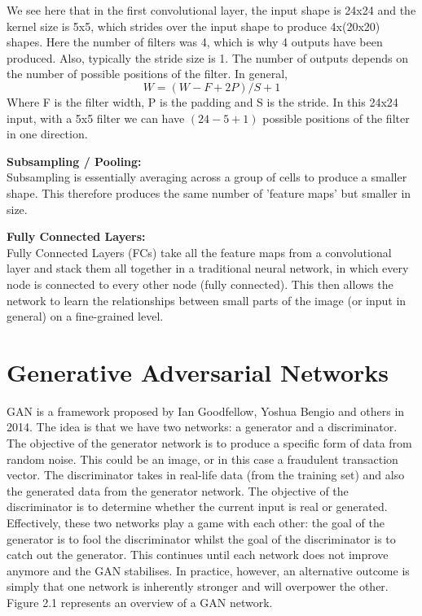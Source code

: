 \documentclass[12pt,a4paper,twoside]{report}
\begin{document}
We see here that in the first convolutional layer, the input shape is 24x24 and the kernel size is 5x5, which strides over the input shape to produce 4x(20x20) shapes. Here the number of filters was 4, which is why 4 outputs have been produced. Also, typically the stride size is 1. The number of outputs depends on the number of possible positions of the filter. In general, $$W=(W-F+2P)/S+1$$ Where F is the filter width, P is the padding and S is the stride. In this 24x24 input, with a 5x5 filter we can have $(24-5+1)$ possible positions of the filter in one direction. 

\textbf{Subsampling / Pooling:}\\
Subsampling is essentially averaging across a group of cells to produce a smaller shape. This therefore produces the same number of 'feature maps' but smaller in size. 

\textbf{Fully Connected Layers:}\\
Fully Connected Layers (FCs) take all the feature maps from a convolutional layer and stack them all together in a traditional neural network, in which every node is connected to every other node (fully connected). This then allows the network to learn the relationships between small parts of the image (or input in general) on a fine-grained level. 


\section{Generative Adversarial Networks}
GAN is a framework proposed by Ian Goodfellow, Yoshua Bengio and others in 2014\cite{2014arXiv1406.2661G}. The idea is that we have two networks: a generator and a discriminator. The objective of the generator network is to produce a specific form of data from random noise. This could be an image, or in this case a fraudulent transaction vector. The discriminator takes in real-life data (from the training set) and also the generated data from the generator network. The objective of the discriminator is to determine whether the current input is real or generated. Effectively, these two networks play a game with each other: the goal of the generator is to fool the discriminator whilst the goal of the discriminator is to catch out the generator. This continues until each network does not improve anymore and the GAN stabilises. In practice, however, an alternative outcome is simply that one network is inherently stronger and will overpower the other. Figure 2.1 represents an overview of a GAN network.
\end{document}
